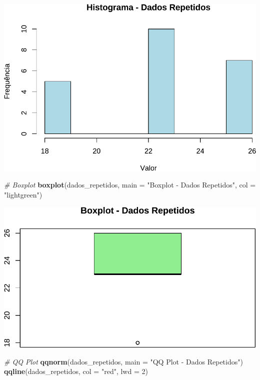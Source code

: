 \documentclass[
]{book}
\newenvironment{Shaded}{\begin{snugshade}}{\end{snugshade}}
\newcommand{\AttributeTok}[1]{\textcolor[rgb]{0.13,0.29,0.53}{#1}}
\newcommand{\CommentTok}[1]{\textcolor[rgb]{0.56,0.35,0.01}{\textit{#1}}}
\newcommand{\DecValTok}[1]{\textcolor[rgb]{0.00,0.00,0.81}{#1}}
\newcommand{\FunctionTok}[1]{\textcolor[rgb]{0.13,0.29,0.53}{\textbf{#1}}}
\newcommand{\NormalTok}[1]{#1}
\newcommand{\StringTok}[1]{\textcolor[rgb]{0.31,0.60,0.02}{#1}}
\begin{document}
\includegraphics{Livro-Estatistica+R_files/figure-latex/dados_repetidos-1.pdf}

\begin{Shaded}
\begin{Highlighting}[]
\CommentTok{\# Boxplot}
\FunctionTok{boxplot}\NormalTok{(dados\_repetidos, }\AttributeTok{main =} \StringTok{"Boxplot {-} Dados Repetidos"}\NormalTok{, }\AttributeTok{col =} \StringTok{"lightgreen"}\NormalTok{)}
\end{Highlighting}
\end{Shaded}

\includegraphics{Livro-Estatistica+R_files/figure-latex/dados_repetidos-2.pdf}

\begin{Shaded}
\begin{Highlighting}[]
\CommentTok{\# QQ Plot}
\FunctionTok{qqnorm}\NormalTok{(dados\_repetidos, }\AttributeTok{main =} \StringTok{"QQ Plot {-} Dados Repetidos"}\NormalTok{)}
\FunctionTok{qqline}\NormalTok{(dados\_repetidos, }\AttributeTok{col =} \StringTok{"red"}\NormalTok{, }\AttributeTok{lwd =} \DecValTok{2}\NormalTok{)}
\end{Highlighting}
\end{Shaded}
\end{document}

